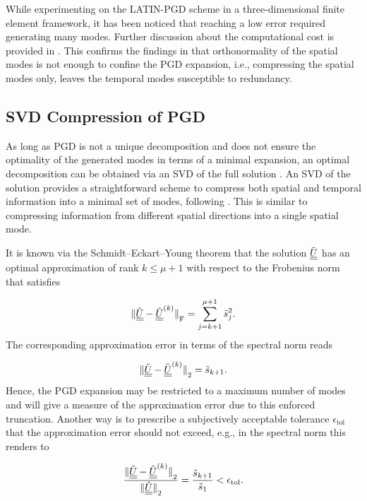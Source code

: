 While experimenting on the LATIN-PGD scheme in a three-dimensional finite element framework, it has been noticed that reaching a low error required generating many modes. Further discussion about the computational cost is provided in . This confirms the findings in \parencite{Giacoma2015} that orthonormality of the spatial modes is not enough to confine the PGD expansion, i.e., compressing the spatial modes only, leaves the temporal modes susceptible to redundancy.

\subsection{SVD Compression of PGD}

As long as PGD is not a unique decomposition and does not ensure the optimality of the generated modes in terms of a minimal expansion, an optimal decomposition can be obtained via an SVD of the full solution \parencite{Eckart1936}.  An SVD of the solution provides a straightforward scheme to compress both spatial and temporal information into a minimal set of modes, following . This is similar to compressing information from different spatial directions into a single spatial mode.

It is known via the Schmidt--Eckart--Young theorem that the solution ${\tilde{\underline{\underline{U}}}}$ has an optimal approximation of rank $k\leq\mu+1$ with respect to the Frobenius norm that satisfies \parencite{Bebendorf2008}

\begin{equation}
	{\lVert {\tilde{\underline{\underline{U}}}} - {\tilde{\underline{\underline{U}}}}^{(k)} \rVert}_\mathrm{F} = \displaystyle \sum_{j=k+1}^{\mu+1} {\tilde{s}}_j^2.
	\label{eq_approx_error}
\end{equation}
The corresponding approximation error in terms of the spectral norm reads

\begin{equation}
	{\lVert {\tilde{\underline{\underline{U}}}} - {\tilde{\underline{\underline{U}}}}^{(k)} \rVert}_\mathrm{2} = {\tilde{s}}_{k+1}.
	\label{eq_approx_error_spectral}
\end{equation}
Hence, the PGD expansion may be restricted to a maximum number of modes and  will give a measure of the approximation error due to this enforced truncation. Another way is to prescribe a subjectively acceptable tolerance $\epsilon_{\mathrm{tol}}$ that the approximation error should not exceed, e.g., in the spectral norm this renders to

\begin{equation}
	\frac{{\lVert {\tilde{\underline{\underline{U}}}} - {\tilde{\underline{\underline{U}}}}^{(k)} \rVert}_\mathrm{2}}{{\lVert {\tilde{\underline{\underline{U}}}} \rVert}_\mathrm{2}} = \frac{{\tilde{s}}_{k+1}}{{\tilde{s}}_1} < \epsilon_{\mathrm{tol}}.
\end{equation}

